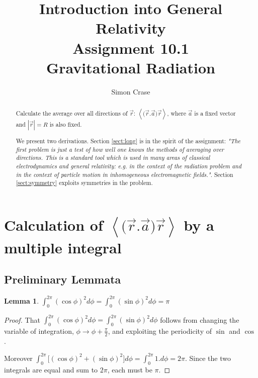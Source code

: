 \documentclass[]{article}
\title{Introduction into General Relativity\\Assignment 10.1\\Gravitational Radiation}
\author{Simon Crase}
\newtheorem{lemma}{Lemma}
\begin{document}
\maketitle

\begin{abstract}
	
	Calculate the average over all directions of $\vec{r}$: $\left\langle \big(\vec{r}.\vec{a}\big)\vec{r} \right\rangle$, where $\vec{a}$ is a fixed vector and $|\vec{r}|=R$ is also fixed.
	
	We present two derivations. Section \ref{sect:long} is in the spirit of the assignment: \emph{"The first problem is just a test of how well one knows the methods of averaging over directions. This is a standard tool which is used in many areas of classical electrodynamics and general relativity: e.g. in the context of the radiation problem and in the context of particle motion in inhomogeneous electromagnetic fields."}. Section \ref{sect:symmetry}  exploits symmetries in the problem.
\end{abstract}

\tableofcontents

\section{Calculation of $\left\langle \big(\vec{r}.\vec{a}\big)\vec{r} \right\rangle$ by a multiple integral}\label{sect:long}
\subsection{Preliminary Lemmata}
\begin{lemma}\label{lemma:i1}
	$\int_{0}^{2\pi}(\cos\phi)^2  d\phi = \int_{0}^{2\pi}(\sin\phi)^2  d\phi=\pi$
\end{lemma}
\begin{proof}
	That $\int_{0}^{2\pi}(\cos\phi)^2  d\phi = \int_{0}^{2\pi}(\sin\phi)^2  d\phi$ follows from changing the variable of integration, $\phi\rightarrow\phi+\frac{\pi}{2}$, and exploiting the periodicity of $\sin$ and $\cos$. 
	
	Moreover $\int_{0}^{2\pi}\big[(\cos\phi)^2  +(\sin\phi)^2\big] d\phi=\int_{0}^{2\pi}1. d\phi=2\pi$. Since the two integrals are equal and sum to $2\pi$, each must be $\pi$.
\end{proof}
\end{document}
